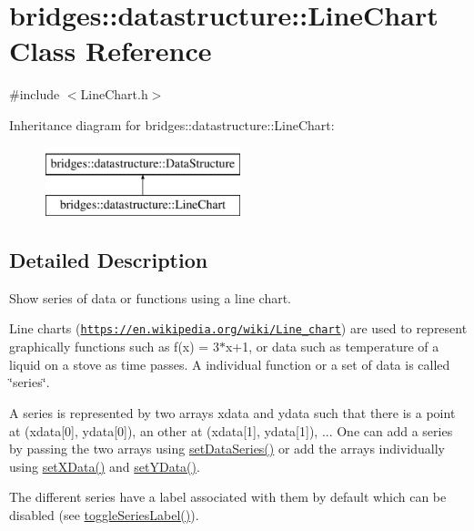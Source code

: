 \hypertarget{classbridges_1_1datastructure_1_1_line_chart}{}\section{bridges\+:\+:datastructure\+:\+:Line\+Chart Class Reference}
\label{classbridges_1_1datastructure_1_1_line_chart}


{\ttfamily \#include $<$Line\+Chart.\+h$>$}

Inheritance diagram for bridges\+:\+:datastructure\+:\+:Line\+Chart\+:\begin{figure}[H]
\begin{center}
\leavevmode
\includegraphics[height=2.000000cm]{classbridges_1_1datastructure_1_1_line_chart}
\end{center}
\end{figure}


\subsection{Detailed Description}
Show series of data or functions using a line chart. 

Line charts (\href{https://en.wikipedia.org/wiki/Line_chart}{\tt https\+://en.\+wikipedia.\+org/wiki/\+Line\+\_\+chart}) are used to represent graphically functions such as f(x) = 3$\ast$x+1, or data such as temperature of a liquid on a stove as time passes. A individual function or a set of data is called \char`\"{}series\char`\"{}.

A series is represented by two arrays xdata and ydata such that there is a point at (xdata\mbox{[}0\mbox{]}, ydata\mbox{[}0\mbox{]}), an other at (xdata\mbox{[}1\mbox{]}, ydata\mbox{[}1\mbox{]}), ... One can add a series by passing the two arrays using \hyperlink{classbridges_1_1datastructure_1_1_line_chart_acb763ea4b2d0f27c73edc3861cc51fbb}{set\+Data\+Series()} or add the arrays individually using \hyperlink{classbridges_1_1datastructure_1_1_line_chart_aa9959489d71e31645f561c4481f050d2}{set\+X\+Data()} and \hyperlink{classbridges_1_1datastructure_1_1_line_chart_a861370f3f7b32cc1a9347727d084d307}{set\+Y\+Data()}.

The different series have a label associated with them by default which can be disabled (see \hyperlink{classbridges_1_1datastructure_1_1_line_chart_a21031cd026426ab91307626ce9651c03}{toggle\+Series\+Label()}).

